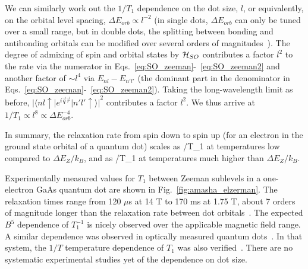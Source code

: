 \documentclass[rmp,twocolumn,aps]{revtex4}
\begin{document}
We can similarly work out the $1/T_1$ dependence on the dot size, $l$, or equivalently, on the orbital level spacing, $\Delta E_{orb} \propto l^{-2}$ (in single dots, $\Delta E_{orb}$ can only be tuned over a small range, but in double dots, the splitting between bonding and antibonding orbitals can be modified over several orders of magnitudes~\cite{wang06}). The degree of admixing of spin and orbital states by ${\cal H}_{SO}$ contributes a factor $l^2$ to the rate via the numerator in Eqs.~\ref{eq:SO_zeeman}-~\ref{eq:SO_zeeman2} and another factor of $\sim l^4$ via $E_{nl} - E_{n'l'}$ (the dominant part in the denominator in Eqs.~\ref{eq:SO_zeeman}-~\ref{eq:SO_zeeman2}). Taking the long-wavelength limit as before, $|\langle n l \uparrow | e^{i\vec{q}\vec{r}} | n' l' \uparrow \rangle|^2$ contributes a factor $l^2$. We thus arrive at $1/T_1 \propto l^8 \propto \Delta E_{orb}^{-4}$.

In summary, the relaxation rate from spin down to spin up (for an electron in the ground state orbital of a quantum dot) scales as
/T_1 \propto {}
\ee
at temperatures low compared to $\Delta E_Z /k_B$, and as
/T_1 \propto {}
\ee
at temperatures much higher than $\Delta E_Z /k_B$.

Experimentally measured values for $T_1$ between Zeeman sublevels in a one-electron GaAs quantum dot are shown in Fig.~\ref{fig:amasha_elzerman}. The relaxation times range from 120 $\mu$s at 14 T to 170 ms at 1.75 T, about 7 orders of magnitude longer than the relaxation rate between dot orbitals~\cite{FujisawaNature2002}. The expected $B^5$ dependence of $T_1^{-1}$ is nicely observed over the applicable magnetic field range. A similar dependence was observed in optically measured quantum dots~\cite{kroutvar04}. In that system, the $1/T$ temperature dependence of $T_1$ was also verified~\cite{heiss05}. There are no systematic experimental studies yet of the dependence on dot size.
\end{document}
